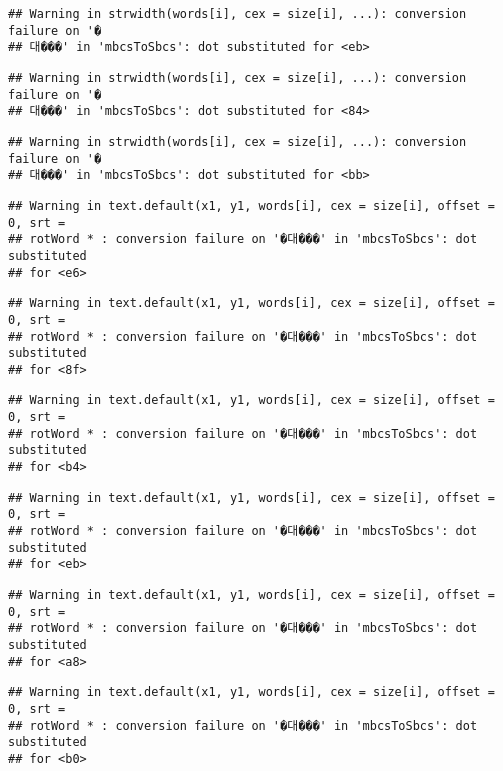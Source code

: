 \documentclass[]{article}
\begin{document}
\begin{verbatim}
## Warning in strwidth(words[i], cex = size[i], ...): conversion failure on '�
## 대���' in 'mbcsToSbcs': dot substituted for <eb>
\end{verbatim}

\begin{verbatim}
## Warning in strwidth(words[i], cex = size[i], ...): conversion failure on '�
## 대���' in 'mbcsToSbcs': dot substituted for <84>
\end{verbatim}

\begin{verbatim}
## Warning in strwidth(words[i], cex = size[i], ...): conversion failure on '�
## 대���' in 'mbcsToSbcs': dot substituted for <bb>
\end{verbatim}

\begin{verbatim}
## Warning in text.default(x1, y1, words[i], cex = size[i], offset = 0, srt =
## rotWord * : conversion failure on '�대���' in 'mbcsToSbcs': dot substituted
## for <e6>
\end{verbatim}

\begin{verbatim}
## Warning in text.default(x1, y1, words[i], cex = size[i], offset = 0, srt =
## rotWord * : conversion failure on '�대���' in 'mbcsToSbcs': dot substituted
## for <8f>
\end{verbatim}

\begin{verbatim}
## Warning in text.default(x1, y1, words[i], cex = size[i], offset = 0, srt =
## rotWord * : conversion failure on '�대���' in 'mbcsToSbcs': dot substituted
## for <b4>
\end{verbatim}

\begin{verbatim}
## Warning in text.default(x1, y1, words[i], cex = size[i], offset = 0, srt =
## rotWord * : conversion failure on '�대���' in 'mbcsToSbcs': dot substituted
## for <eb>
\end{verbatim}

\begin{verbatim}
## Warning in text.default(x1, y1, words[i], cex = size[i], offset = 0, srt =
## rotWord * : conversion failure on '�대���' in 'mbcsToSbcs': dot substituted
## for <a8>
\end{verbatim}

\begin{verbatim}
## Warning in text.default(x1, y1, words[i], cex = size[i], offset = 0, srt =
## rotWord * : conversion failure on '�대���' in 'mbcsToSbcs': dot substituted
## for <b0>
\end{verbatim}
\end{document}
